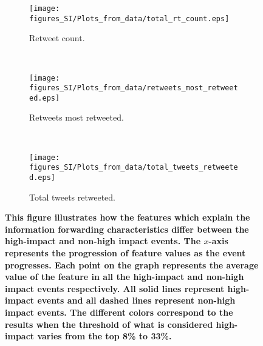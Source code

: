 \begin{figure}
  \centering
  \begin{subfigure}[b]{0.45\textwidth}
    \texttt{[image: figures\_SI/Plots\_from\_data/total\_rt\_count.eps]}
    \caption{Retweet count.} \label{fig:feat_rt_count}
  \end{subfigure}
  ~ %
  \begin{subfigure}[b]{0.45\textwidth}
    \texttt{[image: figures\_SI/Plots\_from\_data/retweets\_most\_retweeted.eps]}
    \caption{Retweets most retweeted.} \label{fig:feat_rt_most_rt}
  \end{subfigure} ~ %

  \begin{subfigure}[b]{0.45\textwidth}
    \texttt{[image: figures\_SI/Plots\_from\_data/total\_tweets\_retweeted.eps]}
    \caption{Total tweets retweeted.} \label{fig:feat_tweets_rt}
  \end{subfigure}
  \caption{\textbf{This figure illustrates how the features which
      explain the information forwarding characteristics differ
      between the high-impact and non-high impact events. The $x$-axis
      represents the progression of feature values as the event
      progresses. Each point on the graph represents the average value
      of the feature in all the high-impact and non-high impact events
      respectively. All solid lines represent high-impact events and
      all dashed lines represent non-high impact events. The different
      colors correspond to the results when the threshold of what is
      considered high-impact varies from the top 8\% to 33\%.
    }}\label{fig:info_forward_hypothesis}
\end{figure}

